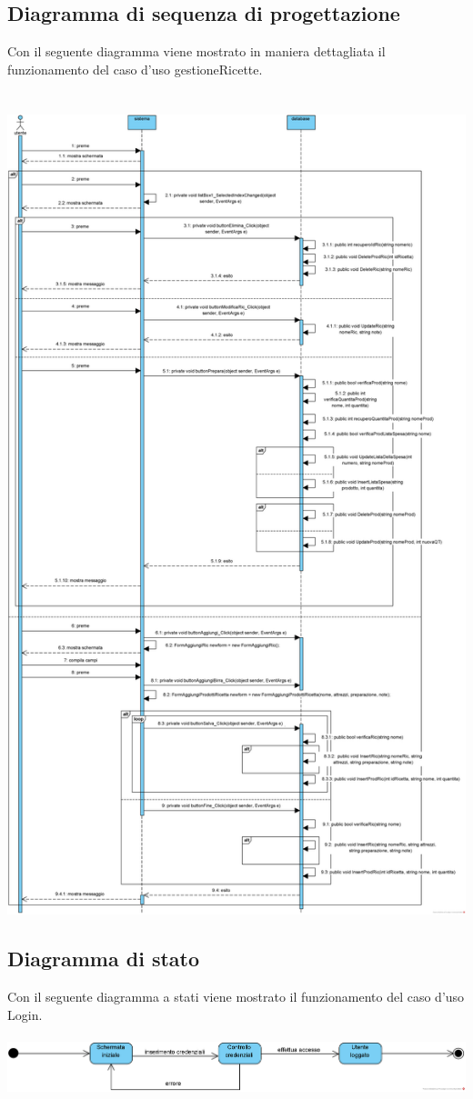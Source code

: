 \documentclass[a4paper, titlepage]{article}
\begin{document}
\subsection{Diagramma di sequenza di progettazione}
Con il seguente diagramma viene mostrato in maniera dettagliata il funzionamento del caso d’uso gestioneRicette.\\\\\
\includegraphics[scale=0.43]{Immagini/Sequence Diagram gestioneRicette.png}
\subsection{Diagramma di stato}
Con il seguente diagramma a stati viene mostrato il funzionamento del caso d'uso Login.\\\\
\includegraphics[scale=0.60]{Immagini/State Machine Diagram Login_Brew Day!.png}
\end{document}
